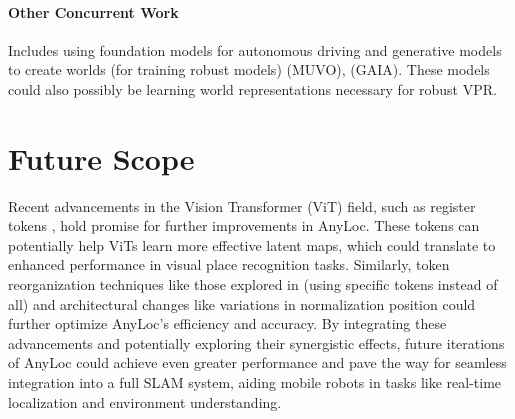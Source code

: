 \paragraph{Other Concurrent Work}

Includes using foundation models for autonomous driving
\cite{Wang2023DriveAG} and generative models to create worlds (for
training robust models) \cite{Bogdoll2023MUVOAM} (MUVO),
\cite{Hu2023GAIA1AG} (GAIA). These models could also possibly be
learning world representations necessary for robust VPR.

\section{Future Scope}

Recent advancements in the Vision Transformer (ViT) field, such as
register tokens \cite{Darcet2023VisionTN}, hold promise for further
improvements in AnyLoc. These tokens can potentially help ViTs learn
more effective latent maps, which could translate to enhanced
performance in visual place recognition tasks. Similarly, token
reorganization techniques like those explored in \cite{Liang2022NotAP}
(using specific tokens instead of all) and architectural changes like
variations in normalization position \cite{Xiong2020OnLN} could
further optimize AnyLoc's efficiency and accuracy. By integrating
these advancements and potentially exploring their synergistic
effects, future iterations of AnyLoc could achieve even greater
performance and pave the way for seamless integration into a full SLAM
system, aiding mobile robots in tasks like real-time localization and
environment understanding.
